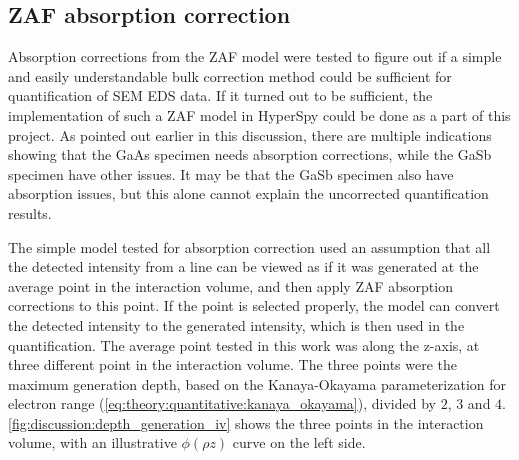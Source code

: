 



\subsection{ZAF absorption correction}
\label{discussion:quantitative:zaf_absorption_correction}

Absorption corrections from the ZAF model were tested to figure out if a simple and easily understandable bulk correction method could be sufficient for quantification of SEM EDS data.
If it turned out to be sufficient, the implementation of such a ZAF model in HyperSpy could be done as a part of this project.
As pointed out earlier in this discussion, there are multiple indications showing that the GaAs specimen needs absorption corrections, while the GaSb specimen have other issues.
It may be that the GaSb specimen also have absorption issues, but this alone cannot explain the uncorrected quantification results.


The simple model tested for absorption correction used an assumption that all the detected intensity from a line can be viewed as if it was generated at the average point in the interaction volume, and then apply ZAF absorption corrections to this point.
If the point is selected properly, the model can convert the detected intensity to the generated intensity, which is then used in the quantification.
The average point tested in this work was along the z-axis, at three different point in the interaction volume.
The three points were the maximum generation depth, based on the Kanaya-Okayama parameterization for electron range (\cref{eq:theory:quantitative:kanaya_okayama}), divided by $2$, $3$ and $4$.
\cref{fig:discussion:depth_generation_iv} shows the three points in the interaction volume, with an illustrative $\phi (\rho z)$ curve on the left side.


